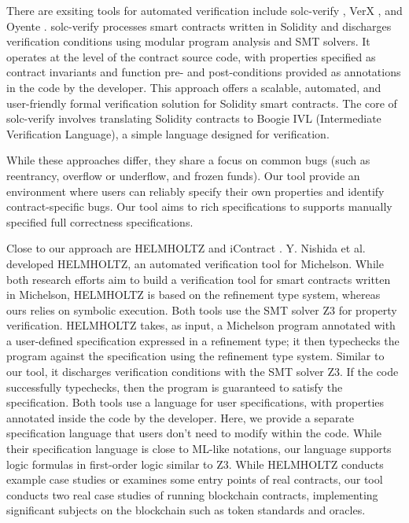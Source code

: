 \documentclass[a4paper,USenglish,cleveref, autoref, thm-restate]{lipics-v2021}
\begin{document}
There are exsiting tools for automated verification include solc-verify \cite{solc}, VerX \cite{verx}, and Oyente \cite{oyente}. solc-verify processes smart contracts written in Solidity and discharges verification conditions using modular program analysis and SMT solvers. It operates at the level of the contract source code, with properties specified as contract invariants and function pre- and post-conditions provided as annotations in the code by the developer. This approach offers a scalable, automated, and user-friendly formal verification solution for Solidity smart contracts. The core of solc-verify involves translating Solidity contracts to Boogie IVL (Intermediate Verification Language), a simple language designed for verification. 

While these approaches differ, they share a focus on common bugs (such as reentrancy, overflow or underflow, and frozen funds). Our tool provide an environment where users can reliably specify their own properties and identify contract-specific bugs. Our tool aims to rich specifications to supports manually specified full correctness specifications.


Close to our approach are HELMHOLTZ \cite{helmholtz} and iContract \cite{icontract}. Y. Nishida et al. \cite{helmholtz} developed HELMHOLTZ, an automated verification tool for Michelson. While both research efforts aim to build a verification tool for smart contracts written in Michelson, HELMHOLTZ is based on the refinement type system, whereas ours relies on symbolic execution. Both tools use the SMT solver Z3 for property verification. HELMHOLTZ takes, as input, a Michelson program annotated with a user-defined specification expressed in a refinement type; it then typechecks the program against the specification using the refinement type system. Similar to our tool, it discharges verification conditions with the SMT solver Z3. If the code successfully typechecks, then the program is guaranteed to satisfy the specification. Both tools use a language for user specifications, with properties annotated inside the code by the developer. Here, we provide a separate specification language that users don't need to modify within the code. While their specification language is close to ML-like notations, our language supports logic formulas in first-order logic similar to Z3. While HELMHOLTZ conducts example case studies or examines some entry points of real contracts, our tool conducts two real case studies of running blockchain contracts, implementing significant subjects on the blockchain such as token standards and oracles.
\end{document}
